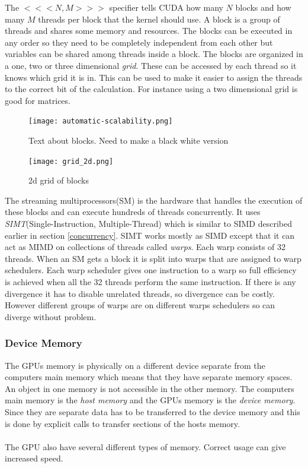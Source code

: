 \documentclass[10pt,a4paper]{report}
\begin{document}
The $<<<N,M>>>$ specifier tells CUDA how many $N$ blocks and how many $M$ threads per block that the kernel should use. A block is a group of threads and shares some memory and resources. The blocks can be executed in any order so they need to be completely independent from each other but variables can be shared among threads inside a block. The blocks are  organized in a one, two or three dimensional \emph{grid}. These can be accessed by each thread so it knows which grid it is in. This can be used to make it easier to assign the threads to the correct bit of the calculation. For instance using a two dimensional grid is good for matrices\cite{cuda, cuda_best_practice}.

\begin{figure}[h]
    \centering
    \texttt{[image: automatic-scalability.png]}
    \caption{Text about blocks. Need to make a black white version}
    \label{fig:blocks_scaling}
\end{figure}

\begin{figure}[h]
    \centering
    \texttt{[image: grid\_2d.png]}
    \caption{2d grid of blocks}
    \label{fig:grid_2d}
\end{figure}

The streaming multiprocessors(SM) is the hardware that handles the execution of these blocks and can execute hundreds of threads concurrently. It uses \emph{SIMT}(Single-Instruction, Multiple-Thread) which is similar to SIMD described earlier in section \ref{concurrency}. SIMT works mostly as SIMD except that it can act as MIMD on collections of threads called \emph{warps}. Each warp consists of 32 threads. When an SM gets a block it is split into warps that are assigned to warp schedulers. Each warp scheduler gives one instruction to a warp so full efficiency is achieved when all the 32 threads perform the same instruction. If there is any divergence it has to disable unrelated threads, so divergence can be costly. However different groups of warps are on different warps schedulers so can diverge without problem.\cite{cuda}


\subsubsection{Device Memory}
The GPUs memory is physically on a different device separate from the computers main memory which means that they have separate memory spaces. An object in one memory is not accessible in the other memory. The computers main memory is the \emph{host memory} and the GPUs memory is the \emph{device memory}. Since they are separate data has to be transferred to the device memory and this is done by explicit calls to transfer sections of the hosts memory.\cite{cuda}\\
\\
The GPU also have several different types of memory\cite{cuda}. Correct usage can give increased speed\cite{cuda, cuda_best_practice}.
\end{document}
